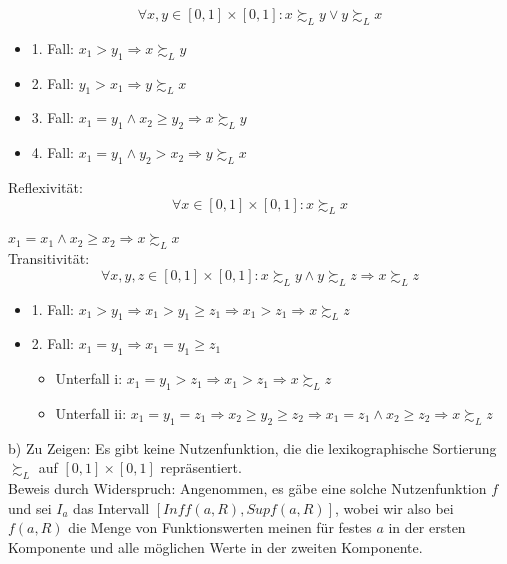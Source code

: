\documentclass{scrartcl}
\begin{document}
\[
\forall x, y \in [0,1] \times [0,1] : x \succsim_{L} y \vee y \succsim_{L} x
\]

\begin{itemize}
\item{1. Fall: $x_1 > y_1 \Rightarrow x \succsim_{L} y$}
\item{2. Fall: $y_1 > x_1 \Rightarrow y \succsim_{L} x$}
\item{3. Fall: $x_1 = y_1 \wedge x_2 \geq y_2 \Rightarrow x \succsim_{L} y$}
\item{4. Fall: $x_1 = y_1 \wedge y_2 > x_2 \Rightarrow y \succsim_{L} x$}
\end{itemize}

Reflexivität: \\

\[
\forall x \in [0,1] \times [0,1] : x \succsim_{L} x
\]

$x_1 = x_1 \wedge x_2 \geq x_2 \Rightarrow x \succsim_{L} x$ \\

Transitivität: \\

\[
\forall x, y, z \in [0,1] \times [0,1] : x \succsim_{L} y \wedge y \succsim_{L} z \Rightarrow
x \succsim_{L} z
\]

\begin{itemize}
\item{1. Fall: $x_1 > y_1 \Rightarrow x_1 > y_1 \geq z_1 \Rightarrow x_1 > z_1 \Rightarrow
x \succsim_{L} z$}
\item{2. Fall: $x_1 = y_1 \Rightarrow x_1 = y_1 \geq z_1$}
\begin{itemize}
\item{Unterfall i: $x_1 = y_1 > z_1 \Rightarrow x_1 > z_1 \Rightarrow x \succsim_{L} z$}
\item{Unterfall ii: $x_1 = y_1 = z_1 \Rightarrow x_2 \geq y_2 \geq z_2 \Rightarrow x_1 = z_1
\wedge x_2 \geq z_2 \Rightarrow x \succsim_{L} z$}
\end{itemize}
\end{itemize}

b) Zu Zeigen: Es gibt keine Nutzenfunktion, die die lexikographische Sortierung $\succsim_{L}$
auf $[0,1] \times [0,1]$ repräsentiert. \\

Beweis durch Widerspruch: Angenommen, es gäbe eine solche Nutzenfunktion $f$ und sei $I_a$ das
Intervall $[Inf f(a,R), Sup f(a,R)]$, wobei wir also bei $f(a,R)$ die Menge von Funktionswerten
meinen für festes $a$ in der ersten Komponente und alle möglichen Werte in der zweiten
Komponente. \\
\end{document}
